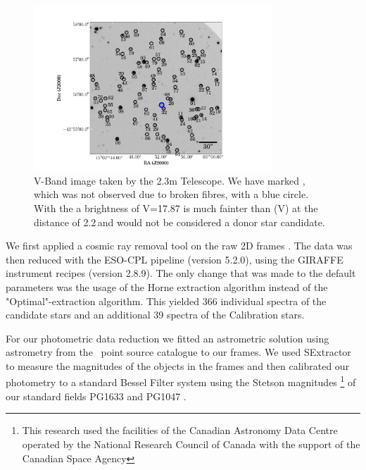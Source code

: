 \begin{figure}[htbp] %
   \centering
   \includegraphics[width=0.8\textwidth]{chapter_sn1006/plots/overview_labeled_sn1006.pdf} 
   \caption[Close-up of the candidates in SN 1006] {V-Band image taken by the 2.3m Telescope. We have marked , which was not observed due to broken fibres, with a blue circle. With the a brightness of V=17.87  is much fainter than \lsun(V) at the distance of 2.2\,\kpc and would not be considered a donor star candidate.}
   \label{fig:overview_sn1006}
\end{figure}


We first applied a cosmic ray removal tool on the raw 2D frames \citep{2001PASP..113.1420V}. The data was then reduced with the ESO-CPL pipeline (version 5.2.0), using the GIRAFFE instrument recipes (version 2.8.9). The only change that was made to the default parameters was the usage of the Horne extraction algorithm instead of the "Optimal"-extraction algorithm. This yielded 366 individual spectra of the candidate stars and an additional 39 spectra of the Calibration stars. 

For our photometric data reduction we fitted an astrometric solution using astrometry from the \twomass\ point source catalogue \citep{2006AJ....131.1163S} to our frames. 
We used SExtractor \citep{1996A&AS..117..393B} to measure the magnitudes of the objects in the frames and then calibrated our photometry to a standard Bessel Filter system using the Stetson magnitudes \footnote{This research used the facilities of the Canadian Astronomy Data Centre operated by the National Research Council of Canada with the support of the Canadian Space Agency}  of our standard fields PG1633 and PG1047 .  

